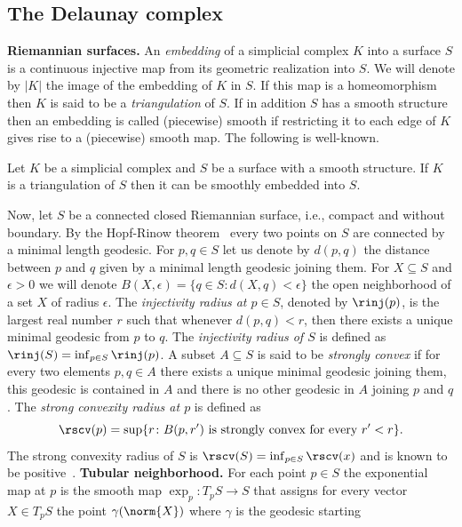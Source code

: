 \subsection{The Delaunay complex}
\noindent
{\bf Riemannian surfaces.}
An \emph{embedding} of a simplicial complex $K$ into a surface $S$ is a continuous injective map from its geometric realization into $S$. We will denote by $|K|$ the image of the embedding of $K$ in $S$. If this map is a homeomorphism then $K$ is said to be a \emph{triangulation} of $S$. If in addition $S$ has a smooth structure then an embedding is called (piecewise) smooth if restricting it to each edge of $K$ gives rise to a (piecewise) smooth map.
The following is well-known.
\begin{theorem}{\cite{hatcher13-triangsurf}}
\label{t:smooth-emb}
Let $K$ be a simplicial complex and $S$ be a surface with a smooth structure. If $K$ is a triangulation of $S$ then it can be smoothly embedded into $S$.
\end{theorem}
%
Now, let $S$ be a connected closed Riemannian surface, i.e., compact and without boundary. By the Hopf-Rinow theorem~\cite{docarmo92-riemannian} every two points on $S$ are connected by a minimal length geodesic. For $p,q\in S$ let us denote by $d(p,q)$ the distance between $p$ and $q$ given by a minimal length geodesic joining them.
For $X\subseteq S$ and $\epsilon >0$ we will denote $B(X,\epsilon) = \{q\in S \colon d(X,q)<\epsilon \}$ the open neighborhood of a set $X$ of radius $\epsilon$.
The \emph{injectivity radius at $p\in S$}, denoted by $\rinj(p)$,
is the largest real number $r$ such that whenever $d(p,q)<r$, then there exists
a unique minimal geodesic from $p$ to $q$. The \emph{injectivity radius of $S$} is defined as $\rinj(S) = \inf_{p\in S} \rinj(p)$.
A subset $A\subseteq S$ is said to be \emph{strongly convex} if for every two elements $p,q\in A$ there exists a unique minimal geodesic joining them, this geodesic is contained in $A$ and there is no other geodesic in $A$ joining $p$ and $q$. 
The \emph{strong convexity radius at $p$} is defined as $$\rscv(p) = \sup \{r \colon B(p,r')~\text{is strongly convex for every}~r' < r \}.$$
The strong convexity radius of $S$ is $\rscv(S) = \inf_{p\in S}\rscv(x)$ and is known to be positive~\cite[1.9.9]{klingenberg95-riemannian}.
%
\vspace{3mm}
\noindent
{\bf Tubular neighborhood.} For each point $p\in S$ the exponential map at $p$ is the smooth map $\exp_p\colon T_pS \rightarrow S$
that assigns for every vector $X\in T_pS$ the point $\gamma(\norm{X})$ where $\gamma$ is the geodesic starting
